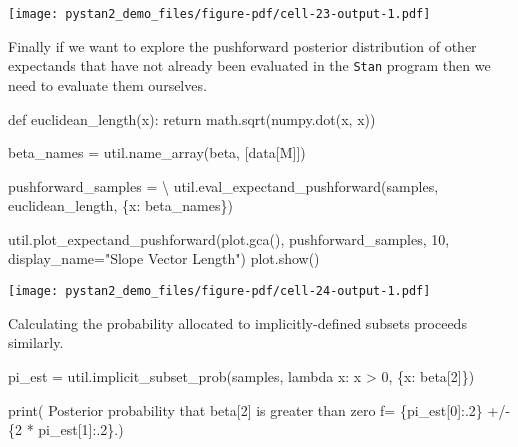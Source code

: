 \documentclass[
  letterpaper,
  DIV=11,
  numbers=noendperiod]{scrartcl}
\newenvironment{Shaded}{\begin{snugshade}}{\end{snugshade}}
\newcommand{\BuiltInTok}[1]{\textcolor[rgb]{0.00,0.23,0.31}{#1}}
\newcommand{\ControlFlowTok}[1]{\textcolor[rgb]{0.00,0.23,0.31}{#1}}
\newcommand{\DecValTok}[1]{\textcolor[rgb]{0.68,0.00,0.00}{#1}}
\newcommand{\KeywordTok}[1]{\textcolor[rgb]{0.00,0.23,0.31}{#1}}
\newcommand{\NormalTok}[1]{\textcolor[rgb]{0.00,0.23,0.31}{#1}}
\newcommand{\OperatorTok}[1]{\textcolor[rgb]{0.37,0.37,0.37}{#1}}
\newcommand{\SpecialCharTok}[1]{\textcolor[rgb]{0.37,0.37,0.37}{#1}}
\newcommand{\SpecialStringTok}[1]{\textcolor[rgb]{0.13,0.47,0.30}{#1}}
\newcommand{\StringTok}[1]{\textcolor[rgb]{0.13,0.47,0.30}{#1}}
\begin{document}
\texttt{[image: pystan2\_demo\_files/figure-pdf/cell-23-output-1.pdf]}

Finally if we want to explore the pushforward posterior distribution of
other expectands that have not already been evaluated in the
\texttt{Stan} program then we need to evaluate them ourselves.

\begin{Shaded}
\begin{Highlighting}[]
\KeywordTok{def}\NormalTok{ euclidean\_length(x):}
  \ControlFlowTok{return}\NormalTok{ math.sqrt(numpy.dot(x, x))}

\NormalTok{beta\_names }\OperatorTok{=}\NormalTok{ util.name\_array(}\StringTok{\textquotesingle{}beta\textquotesingle{}}\NormalTok{, [data[}\StringTok{\textquotesingle{}M\textquotesingle{}}\NormalTok{]])}

\NormalTok{pushforward\_samples }\OperatorTok{=} \OperatorTok{\textbackslash{}}
\NormalTok{  util.eval\_expectand\_pushforward(samples, euclidean\_length,}
\NormalTok{                                  \{}\StringTok{\textquotesingle{}x\textquotesingle{}}\NormalTok{: beta\_names\})}

\NormalTok{util.plot\_expectand\_pushforward(plot.gca(), pushforward\_samples, }\DecValTok{10}\NormalTok{,}
\NormalTok{                                display\_name}\OperatorTok{=}\StringTok{"Slope Vector Length"}\NormalTok{)}
\NormalTok{plot.show()}
\end{Highlighting}
\end{Shaded}

\texttt{[image: pystan2\_demo\_files/figure-pdf/cell-24-output-1.pdf]}

Calculating the probability allocated to implicitly-defined subsets
proceeds similarly.

\begin{Shaded}
\begin{Highlighting}[]
\NormalTok{pi\_est }\OperatorTok{=}\NormalTok{ util.implicit\_subset\_prob(samples,}
                                   \KeywordTok{lambda}\NormalTok{ x: x }\OperatorTok{\textgreater{}} \DecValTok{0}\NormalTok{,}
\NormalTok{                                   \{}\StringTok{\textquotesingle{}x\textquotesingle{}}\NormalTok{: }\StringTok{\textquotesingle{}beta[2]\textquotesingle{}}\NormalTok{\})}

\BuiltInTok{print}\NormalTok{( }\StringTok{\textquotesingle{}Posterior probability that beta[2] is greater than zero \textquotesingle{}}
      \SpecialStringTok{f\textquotesingle{}= }\SpecialCharTok{\{}\NormalTok{pi\_est[}\DecValTok{0}\NormalTok{]}\SpecialCharTok{:.2\}}\SpecialStringTok{ +/{-} }\SpecialCharTok{\{}\DecValTok{2} \OperatorTok{*}\NormalTok{ pi\_est[}\DecValTok{1}\NormalTok{]}\SpecialCharTok{:.2\}}\SpecialStringTok{.\textquotesingle{}}\NormalTok{)}
\end{Highlighting}
\end{Shaded}
\end{document}
